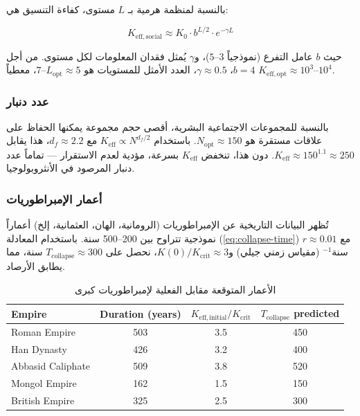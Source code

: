 \documentclass[11pt,a4paper]{article}
\newcommand{\Keff}{K_{\mathrm{eff}}}
\newcommand{\Keffcrit}{K_{\mathrm{crit}}}
\newcommand{\df}{d_{\!f}}
\begin{document}
	بالنسبة لمنظمة هرمية بـ \(L\) مستوى، كفاءة التنسيق هي:
	
	\begin{equation}
		K_{\mathrm{eff},\text{social}} \approx K_0 \cdot b^{L/2} \cdot e^{-\gamma L}
		\label{eq:social-keff}
	\end{equation}
	
	حيث \(b\) عامل التفرع (نموذجياً \(3\)--\(5\))، و\(\gamma\) يُمثل فقدان المعلومات لكل مستوى. من أجل \(b=4\)، \(\gamma \approx 0.5\)، العدد الأمثل للمستويات هو \(L_{\text{opt}} \approx 5\)--\(7\)، معطياً \(K_{\mathrm{eff},\text{opt}} \approx 10^3\)--\(10^4\).
	
	\subsubsection{عدد دنبار}
	
	بالنسبة للمجموعات الاجتماعية البشرية، أقصى حجم مجموعة يمكنها الحفاظ على علاقات مستقرة هو \(N_{\text{opt}} \approx 150\). باستخدام \(\Keff \propto N^{\df/2}\) مع \(\df \approx 2.2\)، هذا يقابل \(\Keff \approx 150^{1.1} \approx 250\). دون هذا، تنخفض \(\Keff\) بسرعة، مؤدية لعدم الاستقرار — تماماً عدد دنبار المرصود في الأنثروبولوجيا.
	
	\subsubsection{أعمار الإمبراطوريات}
	
	تُظهر البيانات التاريخية عن الإمبراطوريات (الرومانية، الهان، العثمانية، إلخ) أعماراً نموذجية تتراوح بين 200--500 سنة. باستخدام المعادلة (\ref{eq:collapse-time}) مع \(r \approx 0.01\) سنة\(^{-1}\) (مقياس زمني جيلي) و\(K(0)/\Keffcrit \approx 3\)، نحصل على \(T_{\text{collapse}} \approx 300\) سنة، مما يطابق الأرصاد.
	
	\begin{table}[htbp]
		\begin{otherlanguage}{english}
			\centering
			\caption{Predicted vs. actual lifetimes of major empires}
			\label{tab:empires}
			\small
			\begin{tabular}{lccc}
				\toprule
				\textbf{Empire} & \textbf{Duration (years)} & $K_{\mathrm{eff},\text{initial}}/\Keffcrit$ & $T_{\text{collapse}}$ predicted \\
				\midrule
				Roman Empire & 503 & 3.5 & 450 \\
				Han Dynasty & 426 & 3.2 & 400 \\
				Abbasid Caliphate & 509 & 3.8 & 520 \\
				Mongol Empire & 162 & 1.5 & 150 \\
				British Empire & 325 & 2.5 & 300 \\
				\bottomrule
			\end{tabular}
		\end{otherlanguage}
		\caption{الأعمار المتوقعة مقابل الفعلية لإمبراطوريات كبرى}
	\end{table}
	
\end{document}
